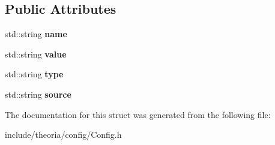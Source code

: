 \subsection*{Public Attributes}
\begin{DoxyCompactItemize}
\item 
\hypertarget{structtheoria_1_1config_1_1Config_1_1Attr_ad39ea60695427392538c9b70631e3893}{std\+::string {\bfseries name}}\label{structtheoria_1_1config_1_1Config_1_1Attr_ad39ea60695427392538c9b70631e3893}

\item 
\hypertarget{structtheoria_1_1config_1_1Config_1_1Attr_a089f492d8f4a5ca06879bef7dfc178f0}{std\+::string {\bfseries value}}\label{structtheoria_1_1config_1_1Config_1_1Attr_a089f492d8f4a5ca06879bef7dfc178f0}

\item 
\hypertarget{structtheoria_1_1config_1_1Config_1_1Attr_a6bb657b1e985b583434f46a868f02908}{std\+::string {\bfseries type}}\label{structtheoria_1_1config_1_1Config_1_1Attr_a6bb657b1e985b583434f46a868f02908}

\item 
\hypertarget{structtheoria_1_1config_1_1Config_1_1Attr_aa2f90ed2b4db859ac6a83ec6b4d085e9}{std\+::string {\bfseries source}}\label{structtheoria_1_1config_1_1Config_1_1Attr_aa2f90ed2b4db859ac6a83ec6b4d085e9}

\end{DoxyCompactItemize}


The documentation for this struct was generated from the following file\+:\begin{DoxyCompactItemize}
\item 
include/theoria/config/Config.\+h\end{DoxyCompactItemize}
